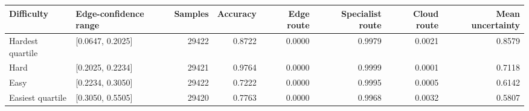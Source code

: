 \begin{tabular}{llrrrrrr}
\toprule
Difficulty & Edge-confidence range & Samples & Accuracy & Edge route & Specialist route & Cloud route & Mean uncertainty \\
\midrule
Hardest quartile & [0.0647, 0.2025] & 29422 & 0.8722 & 0.0000 & 0.9979 & 0.0021 & 0.8579 \\
Hard & [0.2025, 0.2234] & 29421 & 0.9764 & 0.0000 & 0.9999 & 0.0001 & 0.7118 \\
Easy & [0.2234, 0.3050] & 29422 & 0.7222 & 0.0000 & 0.9995 & 0.0005 & 0.6142 \\
Easiest quartile & [0.3050, 0.5505] & 29420 & 0.7763 & 0.0000 & 0.9968 & 0.0032 & 0.5807 \\
\bottomrule
\end{tabular}
